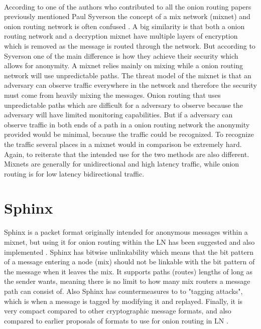 \documentclass[informationsecurity]{gucmasterproject}
\begin{document}
\paragraph{}
According to one of the authors who contributed to all the onion routing papers previously mentioned Paul Syverson the concept of a mix network (mixnet) and onion routing network is often confused \cite{syverson2009m}.
A big similarity is that both a onion routing network and a decryption mixnet have multiple layers of encryption which is removed as the message is routed through the network.
But according to Syverson one of the main difference is how they achieve their security which allows for anonymity. 
A mixnet relies mainly on mixing while a onion routing network will use unpredictable paths. The threat model of the mixnet is that an adversary can observe traffic everywhere in the network and therefore the security must come from heavily mixing the messages. Onion routing that uses unpredictable paths which are difficult for a adversary to observe because the adversary will have limited monitoring capabilities. But if a adversary can observe traffic in both ends of a path in a onion routing network the anonymity provided would be minimal, because the traffic could be recognized. To recognize the traffic several places in a mixnet would in comparison be extremely hard. Again, to reiterate that the intended use for the two methods are also different. Mixnets are generally for unidirectional and high latency traffic, while onion routing is for low latency bidirectional traffic.


\section{Sphinx}

Sphinx \cite{danezis2009sphinx} is a packet format originally intended for anonymous messages within a mixnet, but using it for onion routing within the LN has been suggested \cite{LNDM_onion} \cite{SB_onion} and also implemented \cite{LN_onion_implementation}.
Sphinx has bitwise unlinkability which means that the bit pattern of a message entering a node (mix) should not be linkable with the bit pattern of the message when it leaves the mix. It supports paths (routes) lengths of long as the sender wants, meaning there is no limit to how many mix routers a message path can consist of. Also Sphinx has countermeasures to to "tagging attacks", which is when a message is tagged by modifying it and replayed. Finally, it is very compact compared to other cryptographic message formats, and also compared to earlier proposals of formats to use for onion routing in LN \cite{LNDM_onion}.
\end{document}

